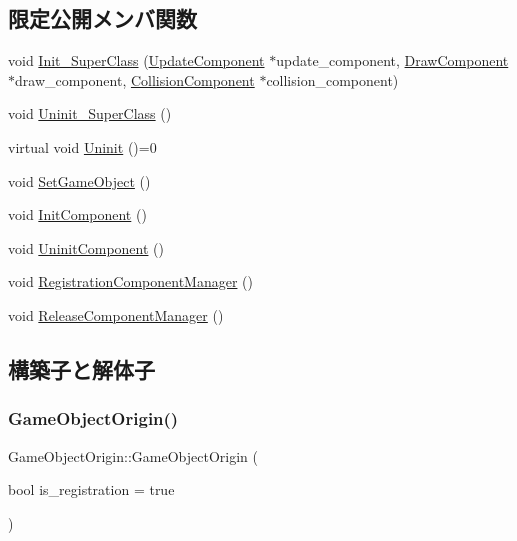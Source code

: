 \subsection*{限定公開メンバ関数}
\begin{DoxyCompactItemize}
\item 
void \mbox{\hyperlink{class_game_object_origin_a0fccade48b059046d8eee1cbabaaf30a}{Init\+\_\+\+Super\+Class}} (\mbox{\hyperlink{class_update_component}{Update\+Component}} $\ast$update\+\_\+component, \mbox{\hyperlink{class_draw_component}{Draw\+Component}} $\ast$draw\+\_\+component, \mbox{\hyperlink{class_collision_component}{Collision\+Component}} $\ast$collision\+\_\+component)
\item 
void \mbox{\hyperlink{class_game_object_origin_a788deb7503c9fa090193138cd13247ba}{Uninit\+\_\+\+Super\+Class}} ()
\item 
virtual void \mbox{\hyperlink{class_game_object_origin_aeac8fc4a1f625982313a9a60dd35d016}{Uninit}} ()=0
\item 
void \mbox{\hyperlink{class_game_object_origin_ab30e4d2dee1b9a1b10cdaccc004804eb}{Set\+Game\+Object}} ()
\item 
void \mbox{\hyperlink{class_game_object_origin_a63d39d07478d90c11066a89e830d5f41}{Init\+Component}} ()
\item 
void \mbox{\hyperlink{class_game_object_origin_a70d7e7923ff9456b0bc7f5f233f49159}{Uninit\+Component}} ()
\item 
void \mbox{\hyperlink{class_game_object_origin_ab2aae550ba6175944b45d2d664579be6}{Registration\+Component\+Manager}} ()
\item 
void \mbox{\hyperlink{class_game_object_origin_affeb64052b115460db71c5b7cfa170d6}{Release\+Component\+Manager}} ()
\end{DoxyCompactItemize}


\subsection{構築子と解体子}
\mbox{\label{class_game_object_origin_a0f262057d72762d4744b7c7306ba5f8e}} 
\subsubsection{\texorpdfstring{Game\+Object\+Origin()}{GameObjectOrigin()}}
{\footnotesize\ttfamily Game\+Object\+Origin\+::\+Game\+Object\+Origin (\begin{DoxyParamCaption}\item[{bool}]{is\+\_\+registration = {\ttfamily true} }\end{DoxyParamCaption})}

